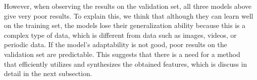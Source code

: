 \documentclass[aps,prb,groupedaddress,twocolumn,showpacs,dvipdfmx,superscriptaddress,pdftex]{revtex4-2}
\begin{document}
\vspace{2mm}


However, when observing the results on the validation set, all three models above give very poor results. To explain this, we think that although they can learn well on the training set, the models lose their generalization ability because this is a complex type of data, which is different from data such as images, videos, or periodic data. If the model's adaptability is not good, poor results on the validation set are predictable. This suggests that there is a need for a method that efficiently utilizes and synthesizes the obtained features, which is discuss in detail in the next subsection.

\vspace{2mm}



\end{document}

